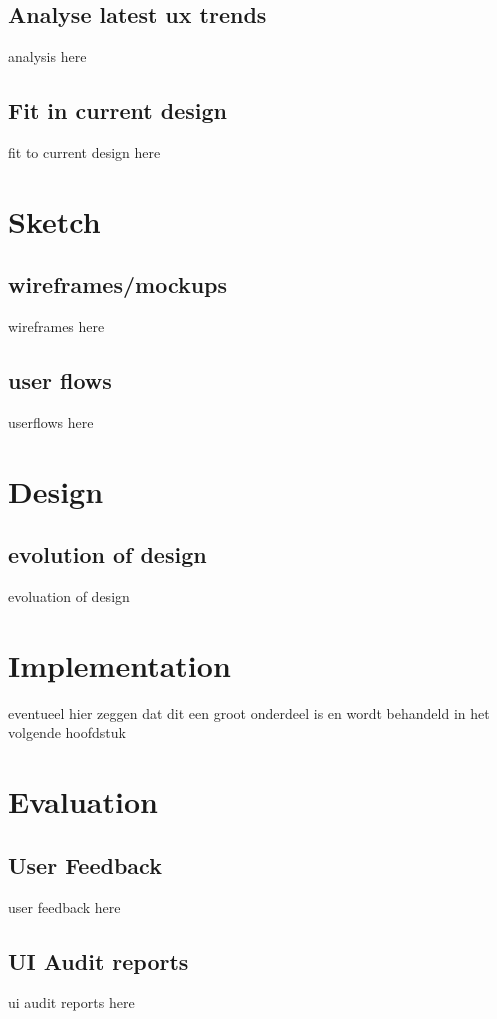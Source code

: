     \subsection{Analyse latest ux trends}
    analysis here
    \subsection{Fit in current design}
    fit to current design here
    
\section{Sketch}
    \subsection{wireframes/mockups}
    wireframes here
    \subsection{user flows}
    userflows here
    
\section{Design}
    \subsection{evolution of design}
    evoluation of design

\section{Implementation}
    eventueel hier zeggen dat dit een groot onderdeel is en wordt behandeld in het volgende hoofdstuk

\section{Evaluation}
    \subsection{User Feedback}
    user feedback here
    \subsection{UI Audit reports}
    ui audit reports here
    
